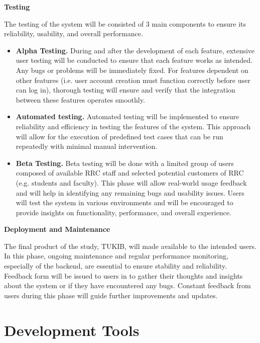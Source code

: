 \noindent\textbf{Testing}

The testing of the system will be consisted of 3 main components to ensure its reliability, usability, and overall performance.

\begin{itemize}
	\item \textbf{Alpha Testing.} During and after the development of each feature, extensive user testing will be conducted to ensure that each feature works as intended. Any bugs or problems will be immediately fixed. For features dependent on other features (i.e. user account creation must function correctly before user can log in), thorough testing will ensure and verify that the integration between these features operates smoothly.
	
	\item \textbf{Automated testing.} Automated testing will be implemented to ensure reliability and efficiency in testing the features of the system. This approach will allow for the execution of predefined test cases that can be run repeatedly with minimal manual intervention.
	
	\item \textbf{Beta Testing.}  Beta testing will be done with a limited group of users composed of available RRC staff and selected potential customers of RRC (e.g. students and faculty). This phase will allow real-world usage feedback and will help in identifying any remaining bugs and usability issues. Users will test the system in various environments and will be encouraged to provide insights on functionality, performance, and overall experience.\newline
\end{itemize}
	
\noindent\textbf{Deployment and Maintenance}

The final product of the study, TUKIB, will made available to the intended users. In this phase, ongoing maintenance and regular performance monitoring, especially of the backend, are essential to ensure stability and reliability. Feedback form will be issued to users in to gather their thoughts and insights about the system or if they have encountered any bugs. Constant feedback from users during this phase will guide further improvements and updates.

\section{Development Tools}

